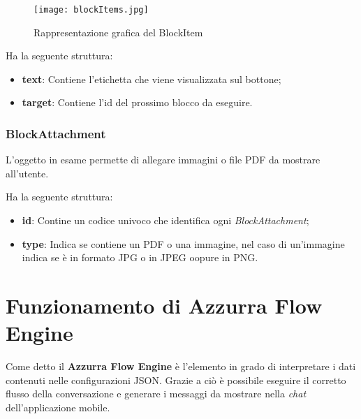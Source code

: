 \begin{figure}[h]
	\centering
	\texttt{[image: blockItems.jpg]}
	\caption{Rappresentazione grafica del BlockItem}
\end{figure}
Ha la seguente struttura:

\begin{itemize}
	\item \textbf{text}: Contiene l'etichetta che viene visualizzata sul bottone;
	\item \textbf{target}: Contiene l'id del prossimo blocco da eseguire.
\end{itemize}



\subsubsection*{BlockAttachment} 
L'oggetto in esame permette di allegare immagini o file PDF da mostrare all'utente.

Ha la seguente struttura:

\begin{itemize}
	\item \textbf{id}: Contine un codice univoco che identifica ogni \textsl{BlockAttachment};
	\item \textbf{type}: Indica se contiene un PDF o una immagine, nel caso di un'immagine indica se è in formato JPG o in JPEG oopure in PNG.
\end{itemize}	

\section{Funzionamento di Azzurra Flow Engine}
Come detto il \textbf{Azzurra Flow Engine} è l'elemento in grado di interpretare i dati contenuti nelle configurazioni JSON. Grazie a ciò è possibile eseguire il corretto flusso della conversazione e generare i messaggi da mostrare nella \emph{chat} dell'applicazione mobile. 
